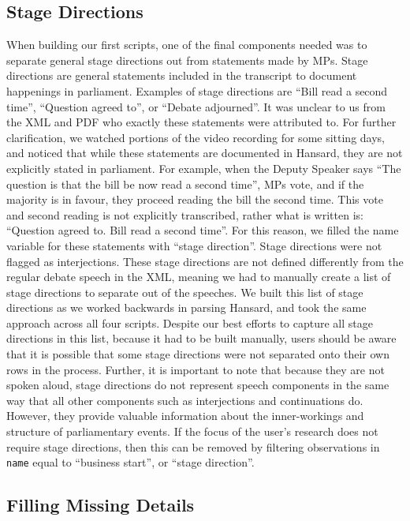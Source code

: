 \documentclass[
  letterpaper,
  DIV=11,
  numbers=noendperiod]{scrartcl}
\begin{document}
\hypertarget{sec-stage}{%
\subsection{Stage Directions}\label{sec-stage}}

When building our first scripts, one of the final components needed was
to separate general stage directions out from statements made by MPs.
Stage directions are general statements included in the transcript to
document happenings in parliament. Examples of stage directions are
``Bill read a second time'', ``Question agreed to'', or ``Debate
adjourned''. It was unclear to us from the XML and PDF who exactly these
statements were attributed to. For further clarification, we watched
portions of the video recording for some sitting days, and noticed that
while these statements are documented in Hansard, they are not
explicitly stated in parliament. For example, when the Deputy Speaker
says ``The question is that the bill be now read a second time'', MPs
vote, and if the majority is in favour, they proceed reading the bill
the second time. This vote and second reading is not explicitly
transcribed, rather what is written is: ``Question agreed to. Bill read
a second time''. For this reason, we filled the name variable for these
statements with ``stage direction''. Stage directions were not flagged
as interjections. These stage directions are not defined differently
from the regular debate speech in the XML, meaning we had to manually
create a list of stage directions to separate out of the speeches. We
built this list of stage directions as we worked backwards in parsing
Hansard, and took the same approach across all four scripts. Despite our
best efforts to capture all stage directions in this list, because it
had to be built manually, users should be aware that it is possible that
some stage directions were not separated onto their own rows in the
process. Further, it is important to note that because they are not
spoken aloud, stage directions do not represent speech components in the
same way that all other components such as interjections and
continuations do. However, they provide valuable information about the
inner-workings and structure of parliamentary events. If the focus of
the user's research does not require stage directions, then this can be
removed by filtering observations in \texttt{name} equal to ``business
start'', or ``stage direction''.

\hypertarget{filling-missing-details}{%
\subsection{Filling Missing Details}\label{filling-missing-details}}
\end{document}
